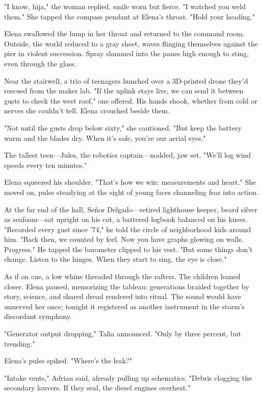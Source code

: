 "I know, hija," the woman replied, smile worn but fierce. "I watched you weld them." She tapped the compass pendant at Elena's throat. "Hold your heading."

Elena swallowed the lump in her throat and returned to the command room. Outside, the world reduced to a gray sheet, waves flinging themselves against the pier in violent succession. Spray slammed into the panes high enough to sting, even through the glass.

Near the stairwell, a trio of teenagers hunched over a 3D-printed drone they'd rescued from the maker lab. "If the uplink stays live, we can send it between gusts to check the west roof," one offered. His hands shook, whether from cold or nerves she couldn't tell. Elena crouched beside them.

"Not until the gusts drop below sixty," she cautioned. "But keep the battery warm and the blades dry. When it's safe, you're our aerial eyes."

The tallest teen—Jules, the robotics captain—nodded, jaw set. "We'll log wind speeds every ten minutes."

Elena squeezed his shoulder. "That's how we win: measurements and heart." She moved on, pulse steadying at the sight of young faces channeling fear into action.

At the far end of the hall, Señor Delgado—retired lighthouse keeper, beard silver as seafoam—sat upright on his cot, a battered logbook balanced on his knees. "Recorded every gust since ’74," he told the circle of neighborhood kids around him. "Back then, we counted by feel. Now you have graphs glowing on walls. Progress." He tapped the barometer clipped to his vest. "But some things don't change. Listen to the hinges. When they start to sing, the eye is close."

As if on cue, a low whine threaded through the rafters. The children leaned closer. Elena paused, memorizing the tableau: generations braided together by story, science, and shared dread rendered into ritual. The sound would have unnerved her once; tonight it registered as another instrument in the storm's discordant symphony.

"Generator output dropping," Talia announced. "Only by three percent, but trending."

Elena's pulse spiked. "Where's the leak?"

"Intake vents," Adrian said, already pulling up schematics. "Debris clogging the secondary louvers. If they seal, the diesel engines overheat."

